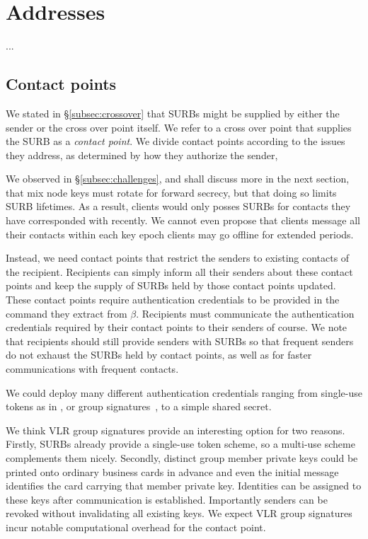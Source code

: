 
\section{Addresses}

...


\subsection{Contact points}\label{subsec:contact_points}

We stated in \S\ref{subsec:crossover} that SURBs might be supplied
by either the sender or the cross over point itself.  We refer to 
a cross over point that supplies the SURB as a {\em contact point}.
We divide contact points according to the issues they address,
as determined by how they authorize the sender,

We observed in \S\ref{subsec:challenges}, and shall discuss more in
the next section, that mix node keys must rotate for forward secrecy,
but that doing so limits SURB lifetimes.  As a result, clients would
only posses SURBs for contacts they have corresponded with recently.
We cannot even propose that clients message all their contacts within
each key epoch clients may go offline for extended periods.

Instead, we need contact points that restrict the senders to existing
contacts of the recipient.  Recipients can simply inform all their
senders about these contact points and keep the supply of SURBs held
by those contact points updated.  These contact points require
authentication credentials to be provided in the command they extract
from $\beta$.  Recipients must communicate the authentication
credentials required by their contact points to their senders of course.
We note that recipients should still provide senders with SURBs so
that frequent senders do not exhaust the SURBs held by contact points,
as well as for faster communications with frequent contacts.

We could deploy many different authentication credentials ranging 
from single-use tokens as in \cite{agl-pond-hmac}, or
 group signatures~\cite{BBS,VLR}, to a simple shared secret.

We think VLR group signatures \cite{VLR} provide an interesting
option for two reasons.  Firstly, SURBs already provide a single-use
token scheme, so a multi-use scheme complements them nicely.  
Secondly, distinct group member private keys could be printed onto
ordinary business cards in advance and even the initial message
identifies the card carrying that member private key.  Identities
can be assigned to these keys after communication is established.  
Importantly senders can be revoked without invalidating all existing
keys.  We expect VLR group signatures incur notable computational
overhead for the contact point.  %

